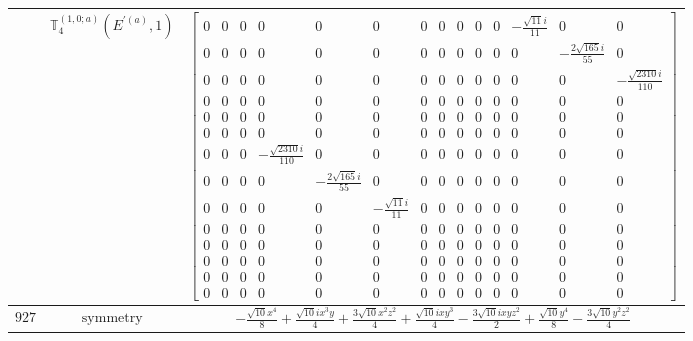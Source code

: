 \documentclass[fleqn,8pt,landscape]{jsarticle}
\begin{document}
\begin{longtable}{ccc}
$  $ & $ \mathbb{T}_{4}^{(1,0;a)}(E^{\prime(a)},1) $ & $ \begin{bmatrix} 0 & 0 & 0 & 0 & 0 & 0 & 0 & 0 & 0 & 0 & 0 & - \frac{\sqrt{11} i}{11} & 0 & 0 \\ 0 & 0 & 0 & 0 & 0 & 0 & 0 & 0 & 0 & 0 & 0 & 0 & - \frac{2 \sqrt{165} i}{55} & 0 \\ 0 & 0 & 0 & 0 & 0 & 0 & 0 & 0 & 0 & 0 & 0 & 0 & 0 & - \frac{\sqrt{2310} i}{110} \\ 0 & 0 & 0 & 0 & 0 & 0 & 0 & 0 & 0 & 0 & 0 & 0 & 0 & 0 \\ 0 & 0 & 0 & 0 & 0 & 0 & 0 & 0 & 0 & 0 & 0 & 0 & 0 & 0 \\ 0 & 0 & 0 & 0 & 0 & 0 & 0 & 0 & 0 & 0 & 0 & 0 & 0 & 0 \\ 0 & 0 & 0 & - \frac{\sqrt{2310} i}{110} & 0 & 0 & 0 & 0 & 0 & 0 & 0 & 0 & 0 & 0 \\ 0 & 0 & 0 & 0 & - \frac{2 \sqrt{165} i}{55} & 0 & 0 & 0 & 0 & 0 & 0 & 0 & 0 & 0 \\ 0 & 0 & 0 & 0 & 0 & - \frac{\sqrt{11} i}{11} & 0 & 0 & 0 & 0 & 0 & 0 & 0 & 0 \\ 0 & 0 & 0 & 0 & 0 & 0 & 0 & 0 & 0 & 0 & 0 & 0 & 0 & 0 \\ 0 & 0 & 0 & 0 & 0 & 0 & 0 & 0 & 0 & 0 & 0 & 0 & 0 & 0 \\ 0 & 0 & 0 & 0 & 0 & 0 & 0 & 0 & 0 & 0 & 0 & 0 & 0 & 0 \\ 0 & 0 & 0 & 0 & 0 & 0 & 0 & 0 & 0 & 0 & 0 & 0 & 0 & 0 \\ 0 & 0 & 0 & 0 & 0 & 0 & 0 & 0 & 0 & 0 & 0 & 0 & 0 & 0 \end{bmatrix} $ \\ \hline
$ 927 $ & $ \text{symmetry} $ & $ - \frac{\sqrt{10} x^{4}}{8} + \frac{\sqrt{10} i x^{3} y}{4} + \frac{3 \sqrt{10} x^{2} z^{2}}{4} + \frac{\sqrt{10} i x y^{3}}{4} - \frac{3 \sqrt{10} i x y z^{2}}{2} + \frac{\sqrt{10} y^{4}}{8} - \frac{3 \sqrt{10} y^{2} z^{2}}{4} $ \\

\end{longtable}
\end{document}
